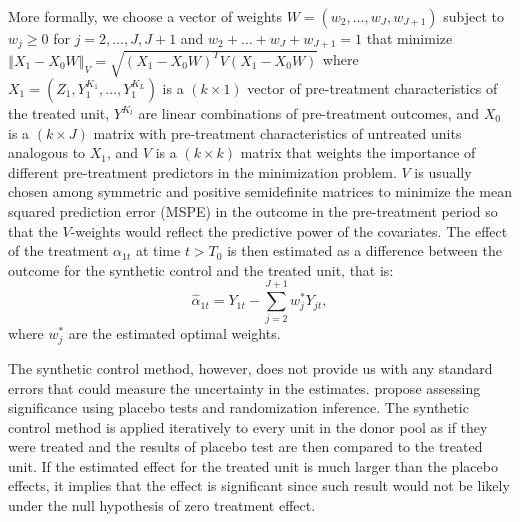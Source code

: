  
 More formally, we choose a vector of weights $W = (w_2, \dots, w_J, w_{J+1})$ subject to $w_j \geq 0$ for $j = 2, \dots, J, J + 1$ and $w_2 +  \dots + w_J + w_{J+1} = 1$ that minimize $\left\Vert X_1 - X_0 W \right\Vert_V = \sqrt{\left(X_1 - X_0 W\right)^T V \left(X_1 - X_0 W\right)}$ where
  $X_1 = (Z_1, Y_1^{K_1}, \dots, Y_1^{K_L})$ is a $(k \times 1)$ vector of pre-treatment characteristics of the treated unit,  $Y^{K_l}$ are linear combinations of
pre-treatment outcomes, and %
  $X_0$ is a $(k \times J)$ matrix with pre-treatment characteristics of untreated units analogous to $X_1$,  and
  $V$ is  a $(k \times k)$  matrix that weights the importance of different pre-treatment predictors in the minimization problem. 
  $V$ is usually chosen among symmetric and positive semidefinite matrices to minimize the  mean squared prediction error (MSPE) in the outcome in the pre-treatment period so that the $V$-weights would reflect the predictive power of the covariates. 
The effect of the treatment $\alpha_{1t}$ at time $t > T_0$ is then estimated as a difference between the outcome for the synthetic control and the treated unit, that is:
\begin{equation}
  \hat\alpha_{1t}  = Y_{1t} - \sum_{j = 2}^{J + 1} w_j^* Y_{jt},
\end{equation}
where $w^*_j$ are the estimated optimal weights. 

The synthetic control method, however, does not provide us with any standard errors that could measure the uncertainty in the estimates.
\citet{abadie_synthetic_2010} propose assessing significance  using  placebo tests and randomization inference. The synthetic control method is applied iteratively to every unit in the donor pool as if they were treated and the results of placebo test are then compared to the treated unit. If the estimated effect for the treated unit is much larger than the placebo effects, it implies that the effect is significant since 
such result would not be likely under the null hypothesis of zero treatment effect.

